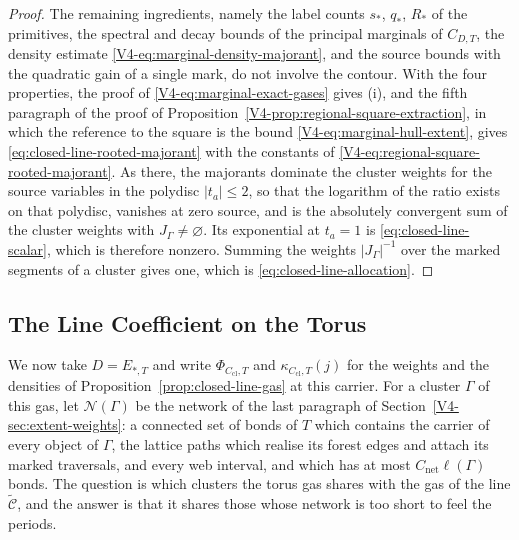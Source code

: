 \documentclass[11pt]{article}
\numberwithin{equation}{section}
\theoremstyle{remark}
\theoremstyle{plain}
\begin{document}
\begin{proof}
The remaining ingredients, namely the label counts $s_*$, $q_*$, $R_*$ of the primitives, the spectral and decay bounds of the principal marginals of $C_{D,T}$, the density estimate \eqref{V4-eq:marginal-density-majorant}, and the source bounds with the quadratic gain of a single mark, do not involve the contour. With the four properties, the proof of \eqref{V4-eq:marginal-exact-gases} gives (i), and the fifth paragraph of the proof of Proposition~\ref{V4-prop:regional-square-extraction}, in which the reference to the square is the bound \eqref{V4-eq:marginal-hull-extent}, gives \eqref{eq:closed-line-rooted-majorant} with the constants of \eqref{V4-eq:regional-square-rooted-majorant}. As there, the majorants dominate the cluster weights for the source variables in the polydisc $| t_a|\leqslant 2$, so that the logarithm of the ratio exists on that polydisc, vanishes at zero source, and is the absolutely convergent sum of the cluster weights with $J_{\Gamma}\neq\varnothing$. Its exponential at $t_a=1$ is \eqref{eq:closed-line-scalar}, which is therefore nonzero. Summing the weights $| J_{\Gamma}|^{-1}$ over the marked segments of a cluster gives one, which is \eqref{eq:closed-line-allocation}.
\end{proof}

\subsection{The Line Coefficient on the Torus}\label{sec:closed-line-density}

We now take $D= E_{*,T}$ and write $\Phi_{C_{\mathrm{cl}},T}$ and $\kappa_{C_{\mathrm{cl}},T}(j)$ for the weights and the densities of Proposition~\ref{prop:closed-line-gas} at this carrier. For a cluster $\Gamma$ of this gas, let $\mathscr N(\Gamma)$ be the network of the last paragraph of Section~\ref{V4-sec:extent-weights}: a connected set of bonds of $T$ which contains the carrier of every object of $\Gamma$, the lattice paths which realise its forest edges and attach its marked traversals, and every web interval, and which has at most $C_{\mathrm{net}}\ell(\Gamma)$ bonds. The question is which clusters the torus gas shares with the gas of the line $\widetilde{\mathcal C}$, and the answer is that it shares those whose network is too short to feel the periods.
\end{document}
